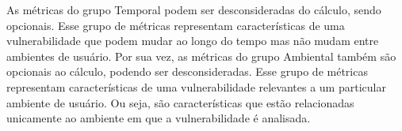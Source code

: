 As métricas do grupo Temporal podem ser desconsideradas do cálculo, sendo opcionais. Esse grupo de métricas representam características de uma vulnerabilidade que podem mudar ao longo do tempo mas não mudam entre ambientes de usuário.
%
Por sua vez, as métricas do grupo Ambiental também são opcionais ao cálculo, podendo ser desconsideradas. Esse grupo de métricas representam características de uma vulnerabilidade relevantes a um particular ambiente de usuário. Ou seja, são características que estão relacionadas unicamente ao ambiente em que a vulnerabilidade é analisada.


